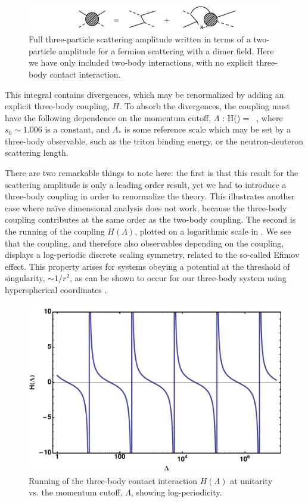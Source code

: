 \begin{figure}
\begin{center}
\includegraphics[width=\linewidth]{Chapter5-figures/3body}
\end{center}
\caption{\label{fig:3bodyint}Full three-particle scattering amplitude written in terms of a two-particle amplitude for a fermion scattering with a dimer field. Here we have only included two-body interactions, with no explicit three-body contact interaction.}
\end{figure}

This integral contains divergences, which may be renormalized by adding an explicit three-body coupling, $H$. To absorb the divergences, the coupling must have the following dependence on the momentum cutoff, $\Lambda$ \cite{Bedaque:1998km,Bedaque:1998kg,Beane:2000wh}:
\beq
H(\Lambda) =  \ ,
\eeq
where $s_0 \sim 1.006$ is a constant, and $\Lambda_{*}$ is some reference scale which may be set by a three-body observable, such as the triton binding energy, or the neutron-deuteron scattering length. 

There are two remarkable things to note here: the first is that this result for the scattering amplitude is only a leading order result, yet we had to introduce a three-body coupling in order to renormalize the theory. This illustrates another case where na\"ive dimensional analysis does not work, because the three-body coupling contributes at the same order as the two-body coupling. The second is the running of the coupling $H(\Lambda)$, plotted on a logarithmic scale in . We see that the coupling, and therefore also observables depending on the coupling, displays a log-periodic discrete scaling symmetry, related to the so-called Efimov effect. This property arises for systems obeying a potential at the threshold of singularity, $\sim 1/r^2$, as can be shown to occur for our three-body system using hyperspherical coordinates \cite{V1970563,Efimov:1971zz}.

\begin{figure}
\begin{center}
\includegraphics[width=0.5\linewidth]{Chapter5-figures/HLambda.pdf}
\end{center}
\caption{\label{fig:HLambda}Running of the three-body contact interaction $H(\Lambda)$ at unitarity vs. the momentum cutoff, $\Lambda$, showing log-periodicity.}
\end{figure}

